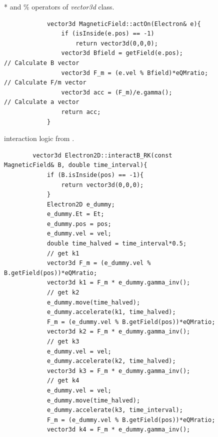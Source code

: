 \documentclass[a4paper,oneside,12pt]{report}
\numberwithin{equation}{chapter}
\begin{document}
{\begin{figure}[H]
    \vspace{5pt}
    \caption{* and \% operators of \textit{vector3d} class.}
    \label{fig:vector3d_dot_cross_product}
\end{figure}

\begin{figure}[H]
        \begin{verbatim}
            vector3d MagneticField::actOn(Electron& e){
                if (isInside(e.pos) == -1)
                    return vector3d(0,0,0);
                vector3d Bfield = getField(e.pos);                        // Calculate B vector
                vector3d F_m = (e.vel % Bfield)*eQMratio;                 // Calculate F/m vector
                vector3d acc = (F_m)/e.gamma();                           // Calculate a vector
                return acc;
            }
        \end{verbatim}
    \vspace{-3pt}
    \caption{\eB interaction logic from .}
    \label{fig:3D_e_B_interaction_first}
\end{figure}


\begin{figure}[H]
    \centering
    \begin{verbatim}
        vector3d Electron2D::interactB_RK(const MagneticField& B, double time_interval){
            if (B.isInside(pos) == -1){
                return vector3d(0,0,0);
            }
            Electron2D e_dummy;
            e_dummy.Et = Et;
            e_dummy.pos = pos;
            e_dummy.vel = vel;
            double time_halved = time_interval*0.5;
            // get k1                                       
            vector3d F_m = (e_dummy.vel % B.getField(pos))*eQMratio;                                       
            vector3d k1 = F_m * e_dummy.gamma_inv();     
            // get k2
            e_dummy.move(time_halved);
            e_dummy.accelerate(k1, time_halved);                                              
            F_m = (e_dummy.vel % B.getField(pos))*eQMratio;                                               
            vector3d k2 = F_m * e_dummy.gamma_inv();    
            // get k3
            e_dummy.vel = vel;
            e_dummy.accelerate(k2, time_halved);
            vector3d k3 = F_m * e_dummy.gamma_inv();   
            // get k4
            e_dummy.vel = vel;
            e_dummy.move(time_halved);
            e_dummy.accelerate(k3, time_interval);                                           
            F_m = (e_dummy.vel % B.getField(pos))*eQMratio;  
            vector3d k4 = F_m * e_dummy.gamma_inv();
        

\end{verbatim}
\end{figure}}
\end{document}
